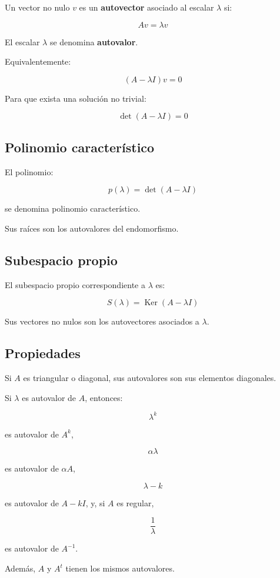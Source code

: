 \documentclass[11pt,a4paper]{article}
\newcommand{\Ker}{\operatorname{Ker}}
\begin{document}
Un vector no nulo $v$ es un \textbf{autovector} asociado al escalar $\lambda$ si:

\[
\boxed{
Av=\lambda v
}
\]

El escalar $\lambda$ se denomina \textbf{autovalor}.

Equivalentemente:

\[
(A-\lambda I)v=0
\]

Para que exista una solución no trivial:

\[
\boxed{
\det(A-\lambda I)=0
}
\]

\subsection{Polinomio característico}

El polinomio:

\[
\boxed{
p(\lambda)=\det(A-\lambda I)
}
\]

se denomina polinomio característico.

Sus raíces son los autovalores del endomorfismo.

\subsection{Subespacio propio}

El subespacio propio correspondiente a $\lambda$ es:

\[
\boxed{
S(\lambda)=\Ker(A-\lambda I)
}
\]

Sus vectores no nulos son los autovectores asociados a $\lambda$.

\subsection{Propiedades}

Si $A$ es triangular o diagonal, sus autovalores son sus elementos diagonales.

Si $\lambda$ es autovalor de $A$, entonces:

\[
\lambda^k
\]

es autovalor de $A^k$,

\[
\alpha\lambda
\]

es autovalor de $\alpha A$,

\[
\lambda-k
\]

es autovalor de $A-kI$, y, si $A$ es regular,

\[
\frac1\lambda
\]

es autovalor de $A^{-1}$.

Además, $A$ y $A^t$ tienen los mismos autovalores.
\end{document}
